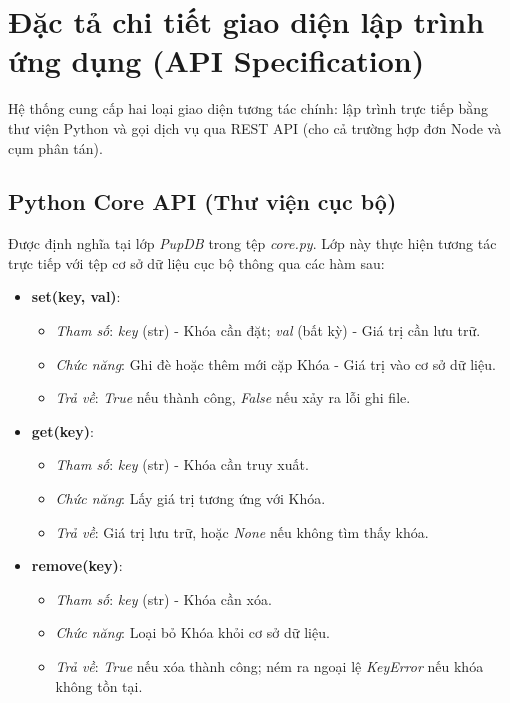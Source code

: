 \documentclass[12pt,a4paper]{report}
\begin{document}
\section{Đặc tả chi tiết giao diện lập trình ứng dụng (API Specification)}
Hệ thống cung cấp hai loại giao diện tương tác chính: lập trình trực tiếp bằng thư viện Python và gọi dịch vụ qua REST API (cho cả trường hợp đơn Node và cụm phân tán).

\subsection{Python Core API (Thư viện cục bộ)}
Được định nghĩa tại lớp \textit{PupDB} trong tệp \textit{core.py}. Lớp này thực hiện tương tác trực tiếp với tệp cơ sở dữ liệu cục bộ thông qua các hàm sau:
\begin{itemize}
    \item \textbf{set(key, val)}:
        \begin{itemize}
            \item \textit{Tham số}: \textit{key} (str) - Khóa cần đặt; \textit{val} (bất kỳ) - Giá trị cần lưu trữ.
            \item \textit{Chức năng}: Ghi đè hoặc thêm mới cặp Khóa - Giá trị vào cơ sở dữ liệu.
            \item \textit{Trả về}: \textit{True} nếu thành công, \textit{False} nếu xảy ra lỗi ghi file.
        \end{itemize}
    \item \textbf{get(key)}:
        \begin{itemize}
            \item \textit{Tham số}: \textit{key} (str) - Khóa cần truy xuất.
            \item \textit{Chức năng}: Lấy giá trị tương ứng với Khóa.
            \item \textit{Trả về}: Giá trị lưu trữ, hoặc \textit{None} nếu không tìm thấy khóa.
        \end{itemize}
    \item \textbf{remove(key)}:
        \begin{itemize}
            \item \textit{Tham số}: \textit{key} (str) - Khóa cần xóa.
            \item \textit{Chức năng}: Loại bỏ Khóa khỏi cơ sở dữ liệu.
            \item \textit{Trả về}: \textit{True} nếu xóa thành công; ném ra ngoại lệ \textit{KeyError} nếu khóa không tồn tại.
        \end{itemize}

\end{itemize}
\end{document}
